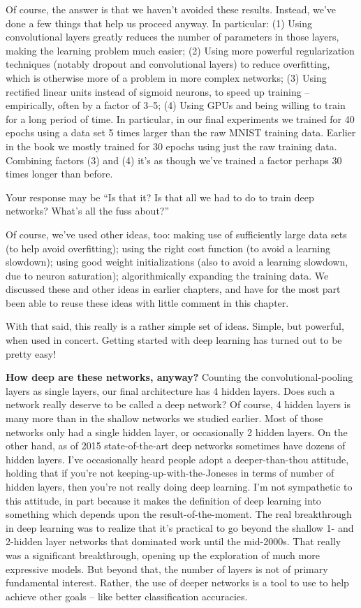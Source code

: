 \documentclass[a4paper,twoside,10pt]{book}
\begin{document}
Of course, the answer is that we haven't avoided these results. Instead, we've done a few things that help us proceed anyway. In particular: (1) Using convolutional layers greatly reduces the number of parameters in those layers, making the learning problem much easier; (2) Using more powerful regularization techniques (notably dropout and convolutional layers) to reduce overfitting, which is otherwise more of a problem in more complex networks; (3) Using rectified linear units instead of sigmoid neurons, to speed up training -- empirically, often by a factor of 3--5; (4) Using GPUs and being willing to train for a long period of time. In particular, in our final experiments we trained for 40 epochs using a data set 5 times larger than the raw MNIST training data. Earlier in the book we mostly trained for 30 epochs using just the raw training data. Combining factors (3) and (4) it's as though we've trained a factor perhaps 30 times longer than before.

Your response may be ``Is that it? Is that all we had to do to train deep networks? What's all the fuss about?''

Of course, we've used other ideas, too: making use of sufficiently large data sets (to help avoid overfitting); using the right cost function (to avoid a learning slowdown); using good weight initializations (also to avoid a learning slowdown, due to neuron saturation); algorithmically expanding the training data. We discussed these and other ideas in earlier chapters, and have for the most part been able to reuse these ideas with little comment in this chapter.

With that said, this really is a rather simple set of ideas. Simple, but powerful, when used in concert. Getting started with deep learning has turned out to be pretty easy!

\textbf{How deep are these networks, anyway?} Counting the convolutional-pooling layers as single layers, our final architecture has 4 hidden layers. Does such a network really deserve to be called a deep network? Of course, 4 hidden layers is many more than in the shallow networks we studied earlier. Most of those networks only had a single hidden layer, or occasionally 2 hidden layers. On the other hand, as of 2015 state-of-the-art deep networks sometimes have dozens of hidden layers. I've occasionally heard people adopt a deeper-than-thou attitude, holding that if you're not keeping-up-with-the-Joneses in terms of number of hidden layers, then you're not really doing deep learning. I'm not sympathetic to this attitude, in part because it makes the definition of deep learning into something which depends upon the result-of-the-moment. The real breakthrough in deep learning was to realize that it's practical to go beyond the shallow 1- and 2-hidden layer networks that dominated work until the mid-2000s. That really was a significant breakthrough, opening up the exploration of much more expressive models. But beyond that, the number of layers is not of primary fundamental interest. Rather, the use of deeper networks is a tool to use to help achieve other goals -- like better classification accuracies.
\end{document}
